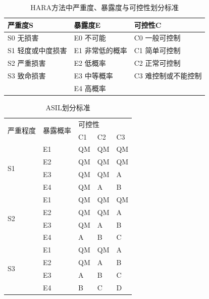 \begin{table}
    \begin{center}
    \begin{tabular}{lll}
        \toprule
        严重度S & 暴露度E & 可控性C \\
        \midrule
        S0 无损害 & E0 不可能 & C0 一般可控制\\
        S1 轻度或中度损害 & E1 非常低的概率& C1 简单可控制\\
        S2 严重损害 & E2 低概率& C2 正常可控制\\
        S3 致命损害 & E3 中等概率& C3 难控制或不能控制\\
        \qquad & E4 高概率 & \qquad\\
        \bottomrule
    \end{tabular}
    \end{center}
    \caption{HARA方法中严重度、暴露度与可控性划分标准}
    \label{tab:HARA_SEC}
\end{table}

\begin{table}
    \begin{center}
    \begin{tabular}{lllll}
    \toprule
    \multirow{2}{*}{严重程度} & \multirow{2}{*}{暴露概率} & \multicolumn{3}{l}{可控性} \\ \cline{3-5}
                        &                       & C1     & C2     & C3    \\
    \midrule
    \multirow{4}{*}{S1}   & E1                    & QM     & QM     & QM    \\
                        & E2                    & QM     & QM     & QM    \\
                        & E3                    & QM     & QM     & A     \\
                        & E4                    & QM     & A      & B     \\
    \midrule
    \multirow{4}{*}{S2}   & E1                    & QM     & QM     & QM    \\
                        & E2                    & QM     & QM     & A     \\
                        & E3                    & QM     & A      & B     \\
                        & E4                    & A      & B      & C     \\
    \midrule
    \multirow{4}{*}{S3}   & E1                    & QM     & QM     & A     \\
                        & E2                    & QM     & A      & B     \\
                        & E3                    & A      & B      & C     \\
                        & E4                    & B      & C      & D     \\
    \bottomrule
    \end{tabular}
    \end{center}
    \caption{ASIL划分标准}
    \label{tab:ASIL}
\end{table}

